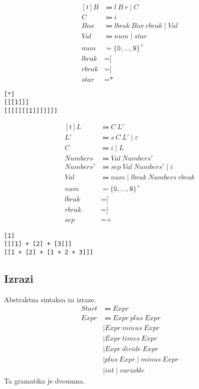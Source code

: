 \documentclass{report}
\newcommand{\Null}{\varepsilon}
\newcommand{\Char}[1]{\texttt{#1}}
\newcommand{\Spc}{\ }
\newcommand{\Union}{\mathrel{|}}
\newcommand{\KleenePlus}[1]{#1^+}
\newcommand{\Arrow}{\Coloneq}
\newcommand{\NT}[1]{{#1}}
\newcommand{\T}[1]{{#1}}
\begin{document}
\begin{equation*}
  \begin{aligned}[t]
    \NT{B} &\Arrow \T{l} \Spc \NT{B} \Spc \T{r} \Union \NT{C}\\
    \NT{C} &\Arrow \T{i}\\[1em]
    \NT{Box} &\Arrow \T{lbrak} \Spc \NT{Box} \Spc \T{rbrak} \Union \NT{Val}\\
    \NT{Val} &\Arrow \T{num} \Union \T{star}\\[1em]
    \T{num} &= \KleenePlus{\{\Char{0}, \dots, \Char{9}\}}\\
    \T{lbrak} &= \Char{[}\\
    \T{rbrak} &= \Char{]}\\
    \T{star} &= \Char{*}
  \end{aligned}
\end{equation*}
\begin{lstlisting}
[*]
[[[1]]]
[[[[[[[1]]]]]]]
\end{lstlisting}

\begin{equation*}
  \begin{aligned}[t]
    \NT{L} &\Arrow \NT{C} \Spc \NT{L'}\\
    \NT{L'} &\Arrow \T{s} \Spc \NT{C} \Spc \NT{L'} \Union \Null\\
    \NT{C} &\Arrow \T{i} \Union \NT{L}\\[1em]
    \NT{Numbers} &\Arrow \T{Val} \Spc \NT{Numbers'}\\
    \NT{Numbers'} &\Arrow \T{sep} \Spc \T{Val} \Spc \NT{Numbers'} \Union \Null\\
    \NT{Val} &\Arrow \T{num} \Union \T{lbrak} \Spc \NT{Numbers} \Spc \T{rbrak}\\[1em]
    \T{num} &= \KleenePlus{\{\Char{0}, \dots, \Char{9}\}}\\
    \T{lbrak} &= \Char{[}\\
    \T{rbrak} &= \Char{]}\\
    \T{sep} &= \Char{+}
  \end{aligned}
\end{equation*}
\begin{lstlisting}
[1]
[[[1] + [2] + [3]]]
[[1 + [2] + [1 + 2 + 3]]]
\end{lstlisting}

\subsection*{Izrazi}

Abstraktna sintaksa za izraze.
\begin{align*}
  \NT{Start} &\Arrow \NT{Expr}\\
  \NT{Expr} &\Arrow \NT{Expr} \Spc \T{plus} \Spc \NT{Expr}\\
  &\Union \NT{Expr} \Spc \T{minus} \Spc \NT{Expr}\\
  &\Union \NT{Expr} \Spc \T{times} \Spc \NT{Expr}\\
  &\Union \NT{Expr} \Spc \T{divide} \Spc \NT{Expr}\\
  &\Union \T{plus} \Spc \NT{Expr} \Union \T{minus} \Spc \NT{Expr}\\
  &\Union \T{int} \Union \T{variable}
\end{align*}
Ta gramatika je dvoumna.
\end{document}
